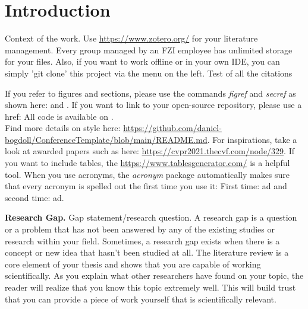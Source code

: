\section{Introduction}
\label{sec:introduction}

Context of the work. Use \url{https://www.zotero.org/} for your literature management. Every group managed by an FZI employee has unlimited storage for your files. Also, if you want to work offline or in your own IDE, you can simply 'git clone' this project via the menu on the left. Test of all the citations
\cite{Bogdoll_Ontology_2022_ECCV}
\cite{Bogdoll_DLCSS_2022_ICECCME}
\cite{Bogdoll_Experiments_2022_ICECCME}
\cite{Woermann_Knowledge_2022_arXiv}
\cite{Bogdoll_Situation_2022_Knowledge}
\cite{Rudolph_Reinforcement_2022_Knowledge}
\cite{Bogdoll_Multimodal_2022_SMC}
\cite{Bogdoll_Anomaly_2022_CVPR}
\cite{Bogdoll_Quantification_2022_IV}
\cite{Bogdoll_Addatasets_2022_VEHITS}
\cite{Toettel_Reliving_2022_ICITE}
\cite{Bogdoll_Taxonomy_2022_FICC}
\cite{Bogdoll_Compressing_2021_NeurIPS}
\cite{Bogdoll_Description_2021_ICCV}
\cite{Bogdoll_KIGLIS_2021_ISC2}
\cite{Reichert_Towards_2021_ISC2}
\cite{Koduri_Aureate_2018_WCX}
\cite{Bogdoll_Augmenting_2017_US}

\cite{Guneshka_Ontology_2022_BA}
\cite{Sartoris_Anomaly_2022_BA}
\cite{Schilling_Anomaly_2022_MA}

\cite{Asam_Openscenario_2020_Web}
\cite{SAE_J3016_2021_Standard}
\cite{IEEE_2846_2022_Standard}

If you refer to figures and sections, please use the commands \textit{figref} and \textit{secref} as shown here:  and . If you want to link to your open-source repository, please use a href: All code is available on \href{https://github.com/daniel-bogdoll/deep_generative_models}{\color{wong-lightblue}{GitHub}}. \\

Find more details on style here: \url{https://github.com/daniel-bogdoll/ConferenceTemplate/blob/main/README.md}. For inspirations, take a look at awarded papers such as here: \url{https://cvpr2021.thecvf.com/node/329}. If you want to include tables, the \url{https://www.tablesgenerator.com/} is a helpful tool. When you use acronyms, the \textit{acronym} package automatically makes sure that every acronym is spelled out the first time you use it: First time: \ac{ad} and second time: \ac{ad}.

\textbf{Research Gap.}
Gap statement/research question. A research gap is a question or a problem that has not been answered by any of the existing studies or research within your field. Sometimes, a research gap exists when there is a concept or new idea that hasn't been studied at all. The literature review is a core element of your thesis and shows that you are capable of working scientifically. As you explain what other researchers have found on your topic, the reader will realize that you know this topic extremely well. This will build trust that you can provide a piece of work yourself that is scientifically relevant.


